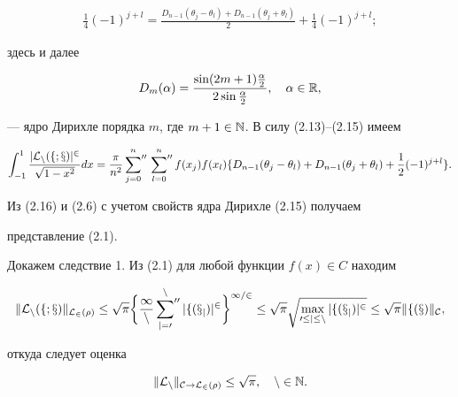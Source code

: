 \begin{pf}
\begin{multline}
\frac{1}{4}(-1)^{j+l}=


\frac{D_{n-1}(\theta_j - \theta_l)+D_{n-1}(\theta_j+\theta_l)}{2}+


\frac{1}{4}(-1)^{j+l};


\end{multline}


здесь и далее


\begin{equation}


D_m(\alpha)=\frac{\sin(2m+1)\frac{\al}{2}}{2\sin\frac{\al}{2}},\quad \al\in \R,


\end{equation}


--- ядро Дирихле порядка $m$, где $m+1\in\Bbb{N}$. В силу (2.13)--(2.15) имеем


\begin{equation}


\int_{-1}^1\frac{|\cal{L}_n(f;x)|^2}{\sqrt{1-x^2}}dx=


\frac{\pi}{n^2}\sideset{}{''}\sum_{j=0}^n


\sideset{}{''}\sum_{l=0}^n f(x_j)f(x_l) \{D_{n-1}(\theta_j-\theta_l)+


D_{n-1}(\theta_j+\theta_l)+\frac{1}{2}(-1)^{j+l}\}.


\end{equation}


Из (2.16) и (2.6) с учетом свойств ядра Дирихле (2.15) получаем 


представление (2.1).


\end{pf}





Докажем следствие 1. Из (2.1) для любой функции $f(x)\in C$ находим


$$


\|\cal{L}_n(f;x)\|_{L_2(\rho)}\le


\sqrt{\pi}\bigg\{\frac{1}{n}\sideset{}{''}\sum_{j=0}^n 


|f(x_j)|^2\bigg\}^{1/2}\le \sqrt{\pi}\sqrt{\max_{0\le


j\le n}|f(x_j)|^2}\le \sqrt{\pi}\|f(x)\|_C,


$$


откуда следует оценка


\begin{equation}


\|\cal{L}_n\|_{C\to L_2(\rho)}\le \sqrt{\pi}, \quad n\in \N.


\end{equation}


